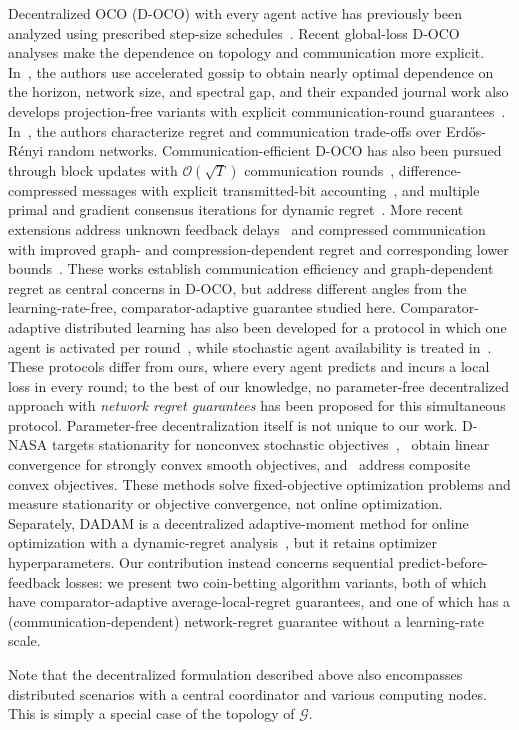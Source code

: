 \documentclass[journal]{IEEEtran}
\begin{document}
    {\color{blue}
        Decentralized OCO (D-OCO) with every agent active has previously been analyzed using prescribed step-size schedules~\cite{hosseini_online_2013,nedic_decentralized_2015}.
        Recent global-loss D-OCO analyses make the dependence on topology and communication more explicit.
        In~\cite{wan_nearly_2024}, the authors use accelerated gossip to obtain nearly optimal dependence on the horizon, network size, and spectral gap, and their expanded journal work also develops projection-free variants with explicit communication-round guarantees~\cite{wan_optimal_2025}.
        In~\cite{lei_online_2020}, the authors characterize regret and communication trade-offs over Erd\H{o}s-R\'enyi random networks.
        Communication-efficient D-OCO has also been pursued through block updates with $\mathcal{O}(\sqrt{T})$ communication rounds~\cite{wan_projection-free_2020}, difference-compressed messages with explicit transmitted-bit accounting~\cite{tu_distributed_2022}, and multiple primal and gradient consensus iterations for dynamic regret~\cite{eshraghi_improving_2022}.
        More recent extensions address unknown feedback delays~\cite{qiu_decentralized_2026} and compressed communication with improved graph- and compression-dependent regret and corresponding lower bounds~\cite{yang_decentralized_2026}.
        These works establish communication efficiency and graph-dependent regret as central concerns in D-OCO, but address different angles from the learning-rate-free, comparator-adaptive guarantee studied here.
        Comparator-adaptive distributed learning has also been developed for a protocol in which one agent is activated per round~\cite{hoeven_distributed_2021}, while stochastic agent availability is treated in~\cite{achddou_distributed_2024}.
        These protocols differ from ours, where every agent predicts and incurs a local loss in every round; to the best of our knowledge, no parameter-free decentralized approach with \emph{network regret guarantees} has been proposed for this simultaneous protocol.
        Parameter-free decentralization itself is not unique to our work.
        D-NASA targets stationarity for nonconvex stochastic objectives~\cite{li_problem_parameter_free_2024},~\cite{kuruzov_achieving_2024} obtain linear convergence for strongly convex smooth objectives, and~\cite{chen_parameter_free_2025} address composite convex objectives.
        These methods solve fixed-objective optimization problems and measure stationarity or objective convergence, not online optimization.
        Separately, DADAM is a decentralized adaptive-moment method for online optimization with a dynamic-regret analysis~\cite{nazari_dadam_2019}, but it retains optimizer hyperparameters.
        Our contribution instead concerns sequential predict-before-feedback losses: we present two coin-betting algorithm variants, both of which have comparator-adaptive average-local-regret guarantees, and one of which has a (communication-dependent) network-regret guarantee without a learning-rate scale.
        \par}
Note that the decentralized formulation described above also encompasses distributed scenarios with a central coordinator and various computing nodes.
This is simply a special case of the topology of $\mathcal{G}$.
\end{document}
